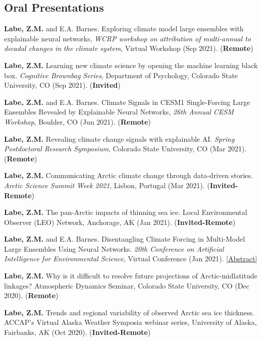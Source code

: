\documentclass[margin,line,palatino,courier,10pt]{res}
\begin{document}
\begin{resume}
\section{\sc \textcolor{Cerulean}{\large{\textbf{Oral Presentations}}}}
\begin{etaremune}[leftmargin=0in,topsep=0in,parsep=0in]
\item \textbf{Labe, Z.M.} and E.A. Barnes. Exploring climate model large ensembles with explainable neural networks, \textit{WCRP workshop on attribution of multi-annual to decadal changes in the climate system}, Virtual Workshop (Sep 2021). (\textbf{Remote})
\item \textbf{Labe, Z.M.} Learning new climate science by opening the machine learning black box. \textit{Cognitive Brownbag Series}, Department of Psychology, Colorado State University, CO (Sep 2021). (\textbf{Invited})
\item \textbf{Labe, Z.M.} and E.A. Barnes. Climate Signals in CESM1 Single-Forcing Large Ensembles Revealed by Explainable Neural Networks, \textit{26th Annual CESM Workshop}, Boulder, CO (Jun 2021). (\textbf{Remote})
\item \textbf{Labe, Z.M.} Revealing climate change signals with explainable AI. \textit{Spring Postdoctoral Research Symposium}, Colorado State University, CO (Mar 2021). (\textbf{Remote})
\item \textbf{Labe, Z.M.} Communicating Arctic climate change through data-driven stories. \textit{Arctic Science Summit Week 2021}, Lisbon, Portugal (Mar 2021). (\textbf{Invited-Remote})
\item \textbf{Labe, Z.M.} The pan-Arctic impacts of thinning sea ice. Local Environmental Observer (LEO) Network, Anchorage, AK (Jan 2021). (\textbf{Invited-Remote})
\item \textbf{Labe, Z.M.} and E.A. Barnes. Disentangling Climate Forcing in Multi-Model Large Ensembles Using Neural Networks. \textit{20th Conference on Artificial Intelligence for Environmental Science}, Virtual Conference (Jan 2021). \href{https://ams.confex.com/ams/101ANNUAL/meetingapp.cgi/Paper/379553}{[Abstract]}
\item \textbf{Labe, Z.M.} Why is it difficult to resolve future projections of Arctic-midlatitude linkages? Atmospheric Dynamics Seminar, Colorado State University, CO (Dec 2020). (\textbf{Remote})
\item \textbf{Labe, Z.M.} Trends and regional variability of observed Arctic sea ice thickness. ACCAP’s Virtual Alaska Weather Symposia webinar series, University of Alaska, Fairbanks, AK (Oct 2020). (\textbf{Invited-Remote})

\end{etaremune}
\end{resume}
\end{document}
